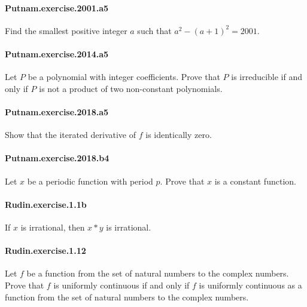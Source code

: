 \documentclass{article}
\begin{document}
\paragraph{Putnam.exercise.2001.a5} Find the smallest positive integer $a$ such that $a^2 - (a+1)^2 = 2001$.

\paragraph{Putnam.exercise.2014.a5} Let $P$ be a polynomial with integer coefficients. Prove that $P$ is irreducible if and only if $P$ is not a product of two non-constant polynomials.

\paragraph{Putnam.exercise.2018.a5} Show that the iterated
derivative of $f$ is identically zero.

\paragraph{Putnam.exercise.2018.b4} Let $x$ be a periodic function with period $p$. Prove that $x$ is a constant function.

\paragraph{Rudin.exercise.1.1b} If $x$ is irrational, then $x * y$ is irrational.



\paragraph{Rudin.exercise.1.12} Let $f$ be a function from the set of natural numbers to the complex numbers. Prove that $f$ is uniformly continuous if and only if $f$ is uniformly continuous as a function from the set of natural numbers to the complex numbers.
\end{document}
